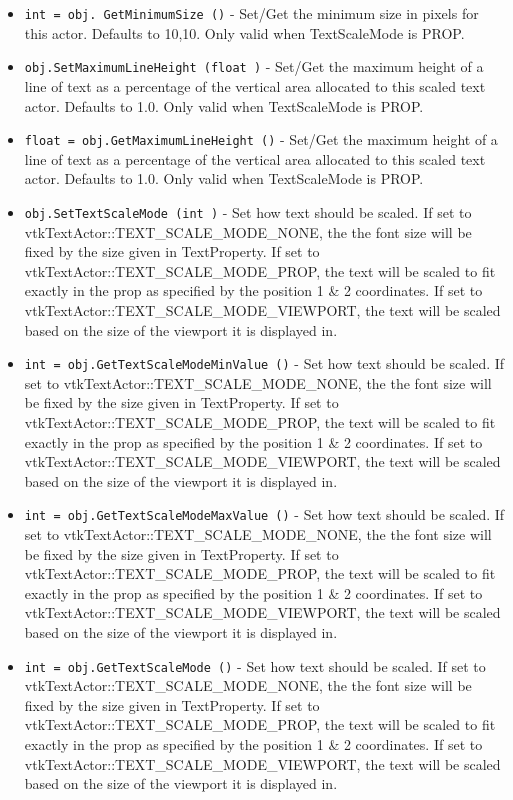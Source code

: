 \begin{itemize}
\item  \verb|int = obj. GetMinimumSize ()| -  Set/Get the minimum size in pixels for this actor.
 Defaults to 10,10.
 Only valid when TextScaleMode is PROP.

\item  \verb|obj.SetMaximumLineHeight (float )| -  Set/Get the maximum height of a line of text as a
 percentage of the vertical area allocated to this
 scaled text actor. Defaults to 1.0.
 Only valid when TextScaleMode is PROP.

\item  \verb|float = obj.GetMaximumLineHeight ()| -  Set/Get the maximum height of a line of text as a
 percentage of the vertical area allocated to this
 scaled text actor. Defaults to 1.0.
 Only valid when TextScaleMode is PROP.

\item  \verb|obj.SetTextScaleMode (int )| -  Set how text should be scaled.  If set to
 vtkTextActor::TEXT\_SCALE\_MODE\_NONE, the the font size will be fixed by the
 size given in TextProperty.  If set to vtkTextActor::TEXT\_SCALE\_MODE\_PROP,
 the text will be scaled to fit exactly in the prop as specified by the
 position 1 \& 2 coordinates.  If set to
 vtkTextActor::TEXT\_SCALE\_MODE\_VIEWPORT, the text will be scaled based on
 the size of the viewport it is displayed in.

\item  \verb|int = obj.GetTextScaleModeMinValue ()| -  Set how text should be scaled.  If set to
 vtkTextActor::TEXT\_SCALE\_MODE\_NONE, the the font size will be fixed by the
 size given in TextProperty.  If set to vtkTextActor::TEXT\_SCALE\_MODE\_PROP,
 the text will be scaled to fit exactly in the prop as specified by the
 position 1 \& 2 coordinates.  If set to
 vtkTextActor::TEXT\_SCALE\_MODE\_VIEWPORT, the text will be scaled based on
 the size of the viewport it is displayed in.

\item  \verb|int = obj.GetTextScaleModeMaxValue ()| -  Set how text should be scaled.  If set to
 vtkTextActor::TEXT\_SCALE\_MODE\_NONE, the the font size will be fixed by the
 size given in TextProperty.  If set to vtkTextActor::TEXT\_SCALE\_MODE\_PROP,
 the text will be scaled to fit exactly in the prop as specified by the
 position 1 \& 2 coordinates.  If set to
 vtkTextActor::TEXT\_SCALE\_MODE\_VIEWPORT, the text will be scaled based on
 the size of the viewport it is displayed in.

\item  \verb|int = obj.GetTextScaleMode ()| -  Set how text should be scaled.  If set to
 vtkTextActor::TEXT\_SCALE\_MODE\_NONE, the the font size will be fixed by the
 size given in TextProperty.  If set to vtkTextActor::TEXT\_SCALE\_MODE\_PROP,
 the text will be scaled to fit exactly in the prop as specified by the
 position 1 \& 2 coordinates.  If set to
 vtkTextActor::TEXT\_SCALE\_MODE\_VIEWPORT, the text will be scaled based on
 the size of the viewport it is displayed in.


\end{itemize}
